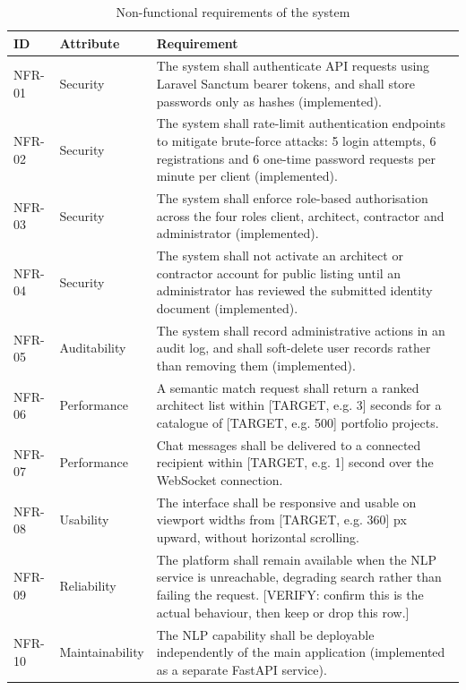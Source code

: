 \begin{table}[H]
  \centering
  \caption{Non-functional requirements of the system}
  \label{tab:nonfunctional-requirements}
  \small
  \begin{tabularx}{\textwidth}{|l|l|X|}
    \hline
    \textbf{ID} & \textbf{Attribute} & \textbf{Requirement} \\
    \hline
    NFR-01 & Security &
      The system shall authenticate API requests using Laravel Sanctum
      bearer tokens, and shall store passwords only as hashes
      (implemented). \\
    \hline
    NFR-02 & Security &
      The system shall rate-limit authentication endpoints to mitigate
      brute-force attacks: 5 login attempts, 6 registrations and 6
      one-time password requests per minute per client
      (implemented). \\
    \hline
    NFR-03 & Security &
      The system shall enforce role-based authorisation across the four
      roles client, architect, contractor and administrator
      (implemented). \\
    \hline
    NFR-04 & Security &
      The system shall not activate an architect or contractor account
      for public listing until an administrator has reviewed the
      submitted identity document (implemented). \\
    \hline
    NFR-05 & Auditability &
      The system shall record administrative actions in an audit log,
      and shall soft-delete user records rather than removing them
      (implemented). \\
    \hline
    NFR-06 & Performance &
      A semantic match request shall return a ranked architect list
      within [TARGET, e.g. 3] seconds for a catalogue of
      [TARGET, e.g. 500] portfolio projects. \\
    \hline
    NFR-07 & Performance &
      Chat messages shall be delivered to a connected recipient within
      [TARGET, e.g. 1] second over the WebSocket connection. \\
    \hline
    NFR-08 & Usability &
      The interface shall be responsive and usable on viewport widths
      from [TARGET, e.g. 360] px upward, without horizontal
      scrolling. \\
    \hline
    NFR-09 & Reliability &
      The platform shall remain available when the NLP service is
      unreachable, degrading search rather than failing the request.
      [VERIFY: confirm this is the actual behaviour, then keep or drop
      this row.] \\
    \hline
    NFR-10 & Maintainability &
      The NLP capability shall be deployable independently of the main
      application (implemented as a separate FastAPI service). \\
    \hline
  \end{tabularx}
\end{table}

